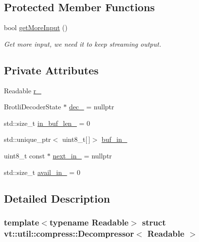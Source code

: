 \subsection*{Protected Member Functions}
\begin{DoxyCompactItemize}
\item 
bool \hyperlink{structvt_1_1util_1_1compress_1_1_decompressor_ac3dbfbc0bf26e58037008071ad4ebb63}{get\+More\+Input} ()
\begin{DoxyCompactList}\small\item\em Get more input, we need it to keep streaming output. \end{DoxyCompactList}\end{DoxyCompactItemize}
\subsection*{Private Attributes}
\begin{DoxyCompactItemize}
\item 
Readable \hyperlink{structvt_1_1util_1_1compress_1_1_decompressor_a1a6c6dcbc87b9d96ff849e745b587f20}{r\+\_\+}
\item 
Brotli\+Decoder\+State $\ast$ \hyperlink{structvt_1_1util_1_1compress_1_1_decompressor_ae65156f7178d43c24eeacf68b157308f}{dec\+\_\+} = nullptr
\item 
std\+::size\+\_\+t \hyperlink{structvt_1_1util_1_1compress_1_1_decompressor_a5e6aa993526c932e80f9c3c40b31722d}{in\+\_\+buf\+\_\+len\+\_\+} = 0
\item 
std\+::unique\+\_\+ptr$<$ uint8\+\_\+t\mbox{[}$\,$\mbox{]}$>$ \hyperlink{structvt_1_1util_1_1compress_1_1_decompressor_a47ec6000bc3a90508998f828551e3cea}{buf\+\_\+in\+\_\+}
\item 
uint8\+\_\+t const  $\ast$ \hyperlink{structvt_1_1util_1_1compress_1_1_decompressor_a466a4d462c81a5032753fdfc11bfd54c}{next\+\_\+in\+\_\+} = nullptr
\item 
std\+::size\+\_\+t \hyperlink{structvt_1_1util_1_1compress_1_1_decompressor_a61e8c9887a2c088f395493c94935fc0d}{avail\+\_\+in\+\_\+} = 0
\end{DoxyCompactItemize}


\subsection{Detailed Description}
\subsubsection*{template$<$typename Readable$>$\newline
struct vt\+::util\+::compress\+::\+Decompressor$<$ Readable $>$}

